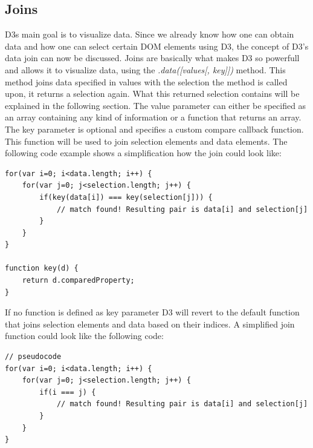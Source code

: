 \documentclass{bioinfo}
\begin{document}
\subsection{Joins} \label{s:joins}
D3s main goal is to visualize data. Since we already know how one can obtain data and how one can select certain DOM elements using D3, the concept of D3's data join can now be discussed. Joins are basically what makes D3 so powerfull and allows it to visualize data, using the \textit{.data([values[, key]])} method.
This method joins data specified in values with the selection the method is called upon, it returns a selection again. What this returned selection contains will be explained in the following section.
\newline
The value parameter can either be specified as an array containing any kind of information or a function that returns an array.
The key parameter is optional and specifies a custom compare callback function.
This function will be used to join selection elements and data elements.
The following code example shows a simplification how the join could look like:
\begin{lstlisting}
for(var i=0; i<data.length; i++) {
	for(var j=0; j<selection.length; j++) {
		if(key(data[i]) === key(selection[j])) {
			// match found! Resulting pair is data[i] and selection[j]
		}
	}
}

function key(d) {
	return d.comparedProperty;
}
\end{lstlisting}
If no function is defined as key parameter D3 will revert to the default function that joins selection elements and data based on their indices.
A simplified join function could look like the following code:
\begin{lstlisting}
// pseudocode
for(var i=0; i<data.length; i++) {
	for(var j=0; j<selection.length; j++) {
		if(i === j) {
			// match found! Resulting pair is data[i] and selection[j]
		}
	}
}
\end{lstlisting}
\end{document}
